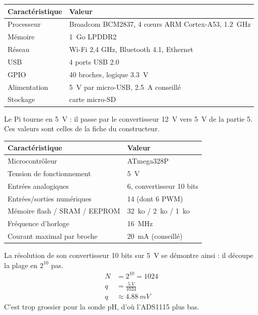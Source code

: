 \noindent
\begin{table}[H]
\centering
\begin{tabularx}{\linewidth}{lY}
\hline
Caractéristique & Valeur \\
\hline
Processeur & Broadcom BCM2837, 4 c\oe urs ARM Cortex-A53, \qty{1,2}{GHz} \\
Mémoire & \qty{1}{Go} LPDDR2 \\
Réseau & Wi-Fi 2,4 GHz, Bluetooth 4.1, Ethernet \\
USB & 4 ports USB 2.0 \\
GPIO & 40 broches, logique \qty{3,3}{V} \\
Alimentation & \qty{5}{V} par micro-USB, \qty{2,5}{A} conseillé \\
Stockage & carte micro-SD \\
\hline
\end{tabularx}
\end{table}
Le Pi tourne en \qty{5}{V} : il passe par le convertisseur \qty{12}{V} vers \qty{5}{V} de la partie 5. Ces valeurs sont celles de la fiche du constructeur.

\noindent
\begin{table}[H]
\centering
\begin{tabularx}{\linewidth}{lY}
\hline
Caractéristique & Valeur \\
\hline
Microcontrôleur & ATmega328P \\
Tension de fonctionnement & \qty{5}{V} \\
Entrées analogiques & 6, convertisseur 10 bits \\
Entrées/sorties numériques & 14 (dont 6 PWM) \\
Mémoire flash / SRAM / EEPROM & \qty{32}{ko} / \qty{2}{ko} / \qty{1}{ko} \\
Fréquence d'horloge & \qty{16}{MHz} \\
Courant maximal par broche & \qty{20}{mA} (conseillé) \\
\hline
\end{tabularx}
\end{table}
La résolution de son convertisseur 10 bits sur \qty{5}{V} se démontre ainsi : il découpe la plage en $2^{10}$ pas.
\begin{align*}
N &= 2^{10} = 1024\\
q &= \frac{\qty{5}{V}}{1024}\\
q &\approx \qty{4,88}{mV}
\end{align*}
C'est trop grossier pour la sonde pH, d'où l'ADS1115 plus bas.

